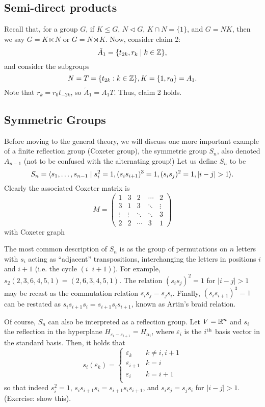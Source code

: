 \subsection{Semi-direct products}

Recall that, for a group $G$, if $K \leq G$, $N \triangleleft G$,
$K \cap N = \{1\}$, and $G = NK$,
then we say $G = K \ltimes N$ or $G = N \rtimes K$.
Now, consider claim 2:
\[
    \tilde{A}_1 = \{t_{2k}, r_k \mid k \in \mathbb{Z}\},
\]
and consider the subgroups
\[
    N = T = \{t_{2k} : k \in \mathbb{Z}\}, K = \{1, r_0\} = A_1.
\]
Note that $r_k = r_0 t_{-2k}$, so $\tilde{A}_1 = A_1T$. Thus, claim 2 holds.

\subsection{Symmetric Groups}

Before moving to the general theory, we will discuss one more important example
of a finite reflection group (Coxeter group), the symmetric group $S_n$, also
denoted $A_{n-1}$ (not to be confused with the alternating group!)
Let us define $S_n$ to be
\[
    S_n = \langle s_1, \dots, s_{n-1} \mid s_i^2 = 1,
    (s_i s_{i+1})^3 = 1,
    (s_i s_j)^2 = 1, |i-j| > 1 \rangle.
\]
Clearly the associated Coxeter matrix is
\[
    M = \begin{pmatrix}
        1 & 3 & 2 & \cdots & 2 \\
        3 & 1 & 3 & \ddots & \vdots \\
        \vdots & \vdots & \ddots & \ddots & 3 \\
        2 & 2 & \cdots & 3 & 1
    \end{pmatrix}
\]
with Coxeter graph

The most common description of $S_n$ is as the group of permutations on $n$
letters with $s_i$ acting as ``adjacent'' transpositions, interchanging the
letters in positions $i$ and $i+1$ (i.e. the cycle $(i \;\; i+1)$).
For example, $s_2(2,3,6,4,5,1) = (2,6,3,4,5,1)$.
The relation $(s_i s_j)^2 = 1$ for $|i-j|>1$ may be recast as the commutation
relation $s_i s_j = s_j s_i$. Finally, $(s_i s_{i+1})^3 = 1$ can be restated
as $s_i s_{i+1} s_i = s_{i+1} s_i s_{i+1}$, known as Artin's braid relation.

Of course, $S_n$ can also be interpreted as a reflection group. Let $V = \mathbb{R}^n$
and $s_i$ the reflection in the hyperplane $H_{\varepsilon_i - \varepsilon_{i+1}}
= H_{\alpha_i}$, where $\varepsilon_i$ is the $i^{\rm th}$ basis vector in the
standard basis. Then, it holds that
\[
    s_i(\varepsilon_k) = \begin{cases}
    \varepsilon_k & k \neq i, i+1 \\
    \varepsilon_{i+1} & k = i \\
    \varepsilon_{i} & k = i+1 \\
    \end{cases}
\]
so that indeed $s_i^2 = 1$, $s_i s_{i+1} s_i = s_{i+1} s_i s_{i+1}$, and
$s_i s_j = s_j s_i$ for $|i-j|>1$. (Exercise: show this).

